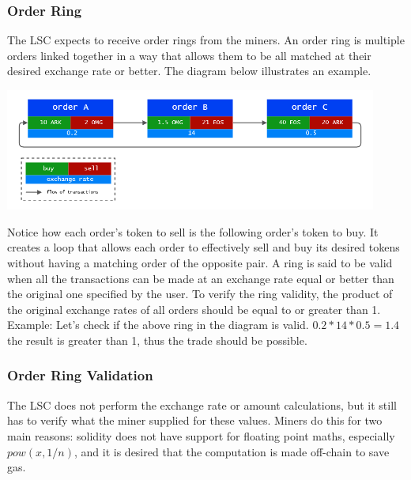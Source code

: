 \documentclass[UTF8,nofonts]{article}
\makeatletter
\newenvironment{figurehere}
 {\def\@captype{figure}}
 {}
\makeatother
\begin{document}
\subsubsection{Order Ring}
The LSC expects to receive order rings from the miners. An order ring is multiple orders linked together in a way that allows them to be all matched at their desired exchange rate or better. The diagram below illustrates an example.
\begin{center}
\begin{figurehere}
\includegraphics[height=4cm]{images/order-ring.png}
\label{fig: Loopringrotocol}
\end{figurehere}
\end{center}

Notice how each order's token to sell is the following order's token to buy. It creates a loop that allows each order to effectively sell and buy its desired tokens without having a matching order of the opposite pair.
A ring is said to be valid when all the transactions can be made at an exchange rate equal or better than the original one specified by the user. To verify the ring validity, the product of the original exchange rates of all orders should be equal to or greater than 1.
Example: Let's check if the above ring in the diagram is valid. $0.2 * 14 * 0.5 = 1.4$ the result is greater than 1, thus the trade should be possible.

\subsubsection{Order Ring Validation}

The LSC does not perform the exchange rate or amount calculations, but it still has to verify what the miner supplied for these values. Miners do this for two main reasons: solidity does not have support for floating point maths, especially $pow(x, 1/n)$, and it is desired that the computation is made off-chain to save gas.
\end{document}
